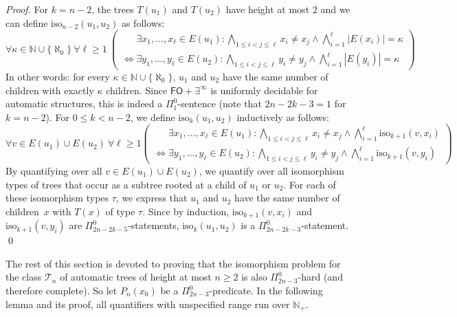 \documentclass[envcountsame]{llncs}
\newcommand{\FO}{\mathsf{FO}}
\newcommand{\N}{\mathbb N}
\newcommand{\T}{\mathcal T}
\begin{document}
\begin{proof}
  For $k=n-2$, the trees $T(u_1)$ and $T(u_2)$ have height at most $2$
  and we can define $\text{iso}_{n-2}(u_1,u_2)$ as follows:
  \[
    \forall \kappa \in \N \cup \{ \aleph_0 \} \
    \forall \ell \geq 1 \
    \left(
    \begin{array}{l}
      \phantom{\iff} \displaystyle \exists x_1,\ldots,x_\ell \in E(u_1) :
      \bigwedge_{1\leq i<j\leq \ell} x_i \neq x_j \wedge
      \bigwedge_{i=1}^\ell |E(x_i)|= \kappa \\
       \iff  \displaystyle\exists y_1,\ldots,y_\ell \in E(u_2) :
      \bigwedge_{1\leq i<j\leq \ell}y_i \neq y_j \wedge
      \bigwedge_{i=1}^\ell |E(y_i)|=\kappa
    \end{array}
    \right)
  \]
  In other words: for every $\kappa \in \N \cup \{ \aleph_0 \}$, $u_1$
  and $u_2$ have the same number of children with exactly $\kappa$
  children. Since $\FO+\exists^\infty$ is uniformly decidable for
  automatic structures, this is indeed a $\Pi^0_1$-sentence (note that
  $2n-2k-3 = 1$ for $k=n-2$). For $0 \leq k < n-2$, we define
  $\text{iso}_k(u_1,u_2)$ inductively as follows:
  \[
    \forall v \in E(u_1) \cup E(u_2) \ \forall \ell \geq 1
    \left(
    \begin{array}{l}
      \displaystyle \phantom{\iff} \exists x_1,\ldots,x_\ell \in E(u_1) :
      \bigwedge_{1\leq i<j\leq \ell} x_i \neq x_j \wedge
      \bigwedge_{i=1}^\ell \text{iso}_{k+1}(v,x_i)  \\
       \iff  \displaystyle\exists y_1,\ldots,y_\ell \in E(u_2) :
      \bigwedge_{1\leq i<j\leq \ell}y_i \neq y_j \wedge
      \bigwedge_{i=1}^\ell \text{iso}_{k+1}(v,y_i)
    \end{array}
    \right)
  \]
  By quantifying over all $v \in E(u_1) \cup E(u_2)$, we quantify over
  all isomorphism types of trees that occur as a subtree rooted at a
  child of $u_1$ or $u_2$. For each of these isomorphism types $\tau$,
  we express that $u_1$ and $u_2$ have the same number of children~$x$
  with $T(x)$ of type $\tau$.  Since by induction,
  $\text{iso}_{k+1}(v,x_i)$ and $\text{iso}_{k+1}(v,y_i)$ are
  $\Pi^0_{2n-2k-5}$-statements, $\text{iso}_k(u_1,u_2)$ is a
  $\Pi^0_{2n-2k-3}$-statement.  \qed
\end{proof}
The rest of this section is devoted to proving that the isomorphism
problem for the class $\T_n$ of automatic trees of height at most
$n\ge2$ is also $\Pi^0_{2n-3}$-hard (and therefore complete). So let
$P_n(x_0)$ be a $\Pi^0_{2n-3}$-predicate.
In the following lemma and its proof, all quantifiers with 
unspecified range run over $\mathbb{N}_+$.
\end{document}
